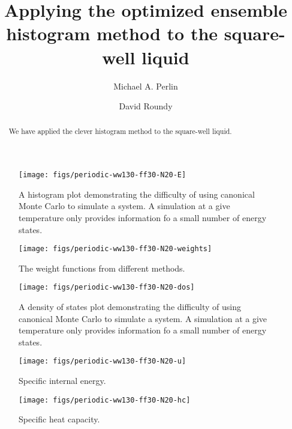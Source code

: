 \documentclass[letterpaper,twocolumn,amsmath,amssymb,pre,aps,10pt]{revtex4-1}
\begin{document}
\title{Applying the optimized ensemble histogram method to the square-well liquid}

\author{Michael A. Perlin}
\author{David Roundy}

\begin{abstract}
  We have applied the clever histogram method to the square-well liquid.
\end{abstract}

\maketitle

\begin{figure}
  \texttt{[image: figs/periodic-ww130-ff30-N20-E]}
  \caption{A histogram plot demonstrating the difficulty of using
    canonical Monte Carlo to simulate a system.  A simulation at a
    give temperature only provides information fo a small number of
    energy states.\label{fig:histograms}}
\end{figure}

\begin{figure}
  \texttt{[image: figs/periodic-ww130-ff30-N20-weights]}
  \caption{The weight functions from different methods.}
\end{figure}

\begin{figure}
  \texttt{[image: figs/periodic-ww130-ff30-N20-dos]}
  \caption{A density of states plot demonstrating the difficulty of using
    canonical Monte Carlo to simulate a system.  A simulation at a
    give temperature only provides information fo a small number of
    energy states.\label{fig:dos}}
\end{figure}

\begin{figure}
  \texttt{[image: figs/periodic-ww130-ff30-N20-u]}
  \caption{Specific internal energy.\label{fig:u}}
\end{figure}

\begin{figure}
  \texttt{[image: figs/periodic-ww130-ff30-N20-hc]}
  \caption{Specific heat capacity.\label{fig:hc}}
\end{figure}

\end{document}
